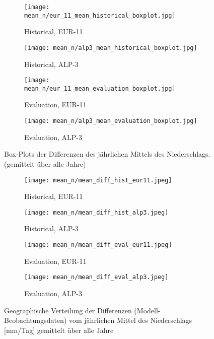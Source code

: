 \begin{figure}[h!]
	\begin{subfigure}{0.49\textwidth}
		\texttt{[image: mean\_n/eur\_11\_mean\_historical\_boxplot.jpg]}
		\caption{Historical, EUR-11}
	\end{subfigure}
	\begin{subfigure}{0.49\textwidth}
		\texttt{[image: mean\_n/alp3\_mean\_historical\_boxplot.jpg]}
		\caption{Historical, ALP-3}
	\end{subfigure}
	\begin{subfigure}{0.49\textwidth}
		\texttt{[image: mean\_n/eur\_11\_mean\_evaluation\_boxplot.jpg]}
		\caption{Evaluation, EUR-11}
	\end{subfigure}
	\begin{subfigure}{0.49\textwidth}
		\texttt{[image: mean\_n/alp3\_mean\_evaluation\_boxplot.jpg]}
		\caption{Evaluation, ALP-3}
	\end{subfigure}
	\caption{Box-Plots der Differenzen des jährlichen Mittels des Niederschlags. (gemittelt über alle Jahre)}
	\label{fig:mean_boxplots}
\end{figure}


\begin{figure}[h!]
	\begin{subfigure}{0.49\textwidth}
		\texttt{[image: mean\_n/mean\_diff\_hist\_eur11.jpeg]}
		\caption{Historical, EUR-11}
	\end{subfigure}
	\begin{subfigure}{0.49\textwidth}
		\texttt{[image: mean\_n/mean\_diff\_hist\_alp3.jpeg]}
		\caption{Historical, ALP-3}
	\end{subfigure}
	\begin{subfigure}{0.49\textwidth}
		\texttt{[image: mean\_n/mean\_diff\_eval\_eur11.jpeg]}
		\caption{Evaluation, EUR-11}
	\end{subfigure}
	\begin{subfigure}{0.49\textwidth}
		\texttt{[image: mean\_n/mean\_diff\_eval\_alp3.jpeg]}
		\caption{Evaluation, ALP-3}
	\end{subfigure}
	\caption{Geographische Verteilung der Differenzen (Modell-Beobachtungsdaten) vom jährlichen Mittel des Niederschlags [mm/Tag] gemittelt über alle Jahre}
	\label{fig:mean_diff}
\end{figure}

